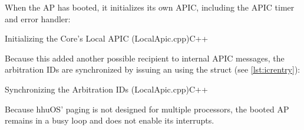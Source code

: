When the AP has booted, it initializes its own APIC, including the APIC timer and error handler:

\begin{codeblock}{Initializing the Core's Local APIC (LocalApic.cpp)}{C++}
\end{codeblock}

Because this added another possible recipient to internal APIC messages, the arbitration IDs are synchronized by issuing an  using the  struct (see \autoref{lst:icrentry}):

\begin{codeblock}{Synchronizing the Arbitration IDs (LocalApic.cpp)}{C++}
\end{codeblock}

Because hhuOS' paging is not designed for multiple processors, the booted AP remains in a busy loop and does not enable its interrupts.

\cleardoublepage